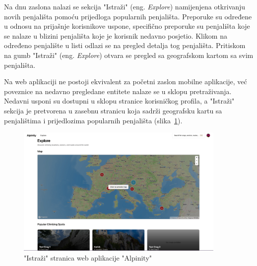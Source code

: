 Na dnu zaslona nalazi se sekcija "Istraži" (eng. \textit{Explore}) namijenjena otkrivanju novih penjališta pomoću prijedloga popularnih penjališta. Preporuke su određene u odnosu na prijašnje korisnikove uspone, specifično preporuke su penjališta koje se nalaze u blizini penjališta koje je korisnik nedavno posjetio. Klikom na određeno penjalište u listi odlazi se na pregled detalja tog penjališta. Pritiskom na gumb "Istraži" (eng. \textit{Explore}) otvara se pregled sa geografskom kartom sa svim penjališta.

Na web aplikaciji ne postoji ekvivalent za početni zaslon mobilne aplikacije, već poveznice na nedavno pregledane entitete nalaze se u sklopu pretraživanja. Nedavni usponi su dostupni u sklopu stranice korisničkog profila, a "Istraži" sekcija je pretvorena u zasebnu stranicu koja sadrži geografsku kartu sa penjalištima i prijedlozima popularnih penjališta (slika~\ref{fig:istrazivanje_web}).

\begin{figure}[H]
    \centering
    \includegraphics[width=0.9\textwidth]{images/implementacija/web/explore.jpeg}
    \caption{"Istraži" stranica web aplikacije "Alpinity"}
    \label{fig:istrazivanje_web}
\end{figure}